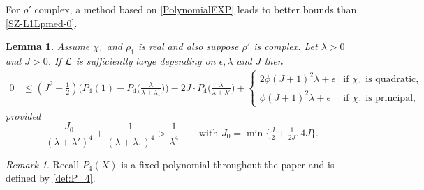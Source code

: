 \documentclass[12pt,psamsfonts]{amsart}
\newtheorem{lem}[thm]{Lemma}
\theoremstyle{definition}
\theoremstyle{remark}
\newtheorem*{rem*}{Remark}
\numberwithin{equation}{section}
\begin{document}
For $\rho'$ complex, a method based on \cref{PolynomialEXP} leads to better bounds than \cref{SZ-L1Lpmed-0}. 
\begin{lem} \label{SZ-L1Lpmedium} Assume $\chi_1$ and $\rho_1$ is real and also suppose $\rho'$ is complex.  Let  $\lambda > 0$ and $J > 0$. If $\mathcal{L}$ is sufficiently large depending on $\epsilon, \lambda$ and $J$ then
\begin{align*}
0 & \leq (J^2 + \tfrac{1}{2}) \big( P_4(1) - P_4\big( \frac{\lambda}{\lambda+\lambda_1} \big) \big) - 2J \cdot P_4\big( \frac{\lambda}{\lambda+\lambda'} \big)  +
\begin{cases}   
2 \phi  (J+1)^2 \lambda  + \epsilon& \text{if $\chi_1$ is quadratic}, \\
\phi  (J+1)^2 \lambda + \epsilon & \text{if $\chi_1$ is principal},
\end{cases}
\end{align*}
provided
\begin{equation}
\frac{J_0}{(\lambda+\lambda')^4} + \frac{1}{(\lambda+\lambda_1)^4} > \frac{1}{\lambda^4} \qquad \text{with  $J_0 = \min\{ \tfrac{J}{2} + \tfrac{1}{2J}, 4J\}$.}
\label{SZ-L1Lpmedium-Condition}
\end{equation}
\end{lem}
\begin{rem*} Recall $P_4(X)$ is a fixed polynomial throughout the paper and is defined by \eqref{def:P_4}. 
\end{rem*}
\end{document}
